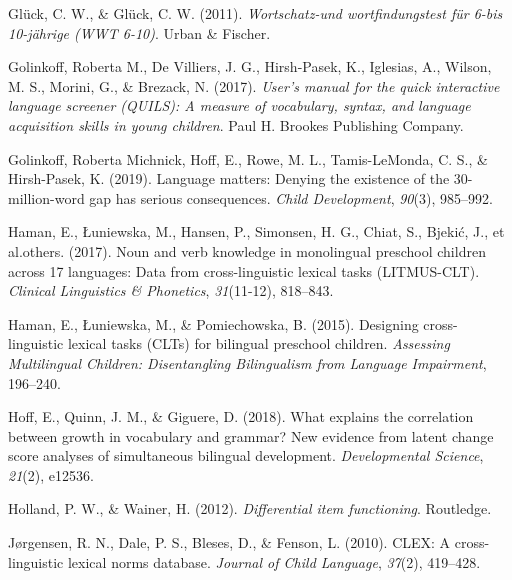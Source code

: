 \documentclass[
  man,floatsintext]{apa6}
\newlength{\cslhangindent}
\newlength{\cslentryspacingunit} %
\newenvironment{CSLReferences}[2] %
 {%
  \setlength{\parindent}{0pt}
  \ifodd #1
  \let\oldpar\par
  \def\par{\hangindent=\cslhangindent\oldpar}
  \fi
  \setlength{\parskip}{#2\cslentryspacingunit}
 }%
 {}
\begin{document}
\begin{CSLReferences}{1}{0}
\leavevmode{}%
Glück, C. W., \& Glück, C. W. (2011). \emph{Wortschatz-und wortfindungstest f{ü}r 6-bis 10-j{ä}hrige (WWT 6-10)}. Urban \& Fischer.

\leavevmode{}%
Golinkoff, Roberta M., De Villiers, J. G., Hirsh-Pasek, K., Iglesias, A., Wilson, M. S., Morini, G., \& Brezack, N. (2017). \emph{User's manual for the quick interactive language screener (QUILS): A measure of vocabulary, syntax, and language acquisition skills in young children}. Paul H. Brookes Publishing Company.

\leavevmode{}%
Golinkoff, Roberta Michnick, Hoff, E., Rowe, M. L., Tamis-LeMonda, C. S., \& Hirsh-Pasek, K. (2019). Language matters: Denying the existence of the 30-million-word gap has serious consequences. \emph{Child Development}, \emph{90}(3), 985--992.

\leavevmode{}%
Haman, E., Łuniewska, M., Hansen, P., Simonsen, H. G., Chiat, S., Bjekić, J., et al.others. (2017). Noun and verb knowledge in monolingual preschool children across 17 languages: Data from cross-linguistic lexical tasks (LITMUS-CLT). \emph{Clinical Linguistics \& Phonetics}, \emph{31}(11-12), 818--843.

\leavevmode{}%
Haman, E., Łuniewska, M., \& Pomiechowska, B. (2015). Designing cross-linguistic lexical tasks (CLTs) for bilingual preschool children. \emph{Assessing Multilingual Children: Disentangling Bilingualism from Language Impairment}, 196--240.

\leavevmode{}%
Hoff, E., Quinn, J. M., \& Giguere, D. (2018). What explains the correlation between growth in vocabulary and grammar? New evidence from latent change score analyses of simultaneous bilingual development. \emph{Developmental Science}, \emph{21}(2), e12536.

\leavevmode{}%
Holland, P. W., \& Wainer, H. (2012). \emph{Differential item functioning}. Routledge.

\leavevmode{}%
Jørgensen, R. N., Dale, P. S., Bleses, D., \& Fenson, L. (2010). CLEX: A cross-linguistic lexical norms database. \emph{Journal of Child Language}, \emph{37}(2), 419--428.


\end{CSLReferences}
\end{document}
